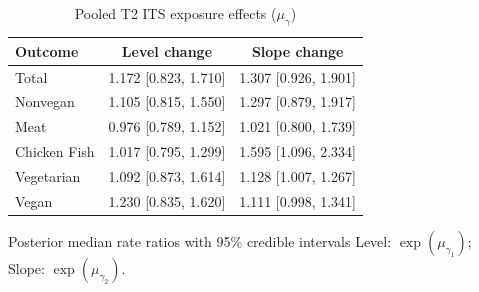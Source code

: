 \begin{table}[H]
\centering
\caption{Pooled T2 ITS exposure effects ($\mu_\gamma$)}
\label{tab:a3_t2_mu_gamma}
\begin{tabular}{lcc}
\toprule
Outcome & Level change & Slope change \\
\midrule
Total & 1.172 [0.823, 1.710] & 1.307 [0.926, 1.901] \\
Nonvegan & 1.105 [0.815, 1.550] & 1.297 [0.879, 1.917] \\
Meat & 0.976 [0.789, 1.152] & 1.021 [0.800, 1.739] \\
Chicken Fish & 1.017 [0.795, 1.299] & 1.595 [1.096, 2.334] \\
Vegetarian & 1.092 [0.873, 1.614] & 1.128 [1.007, 1.267] \\
Vegan & 1.230 [0.835, 1.620] & 1.111 [0.998, 1.341] \\
\bottomrule
\end{tabular}
\par\smallskip\footnotesize Posterior median rate ratios with 95\% credible intervals Level: $\exp(\mu_{\gamma_1})$; Slope: $\exp(\mu_{\gamma_2})$.
\end{table}
